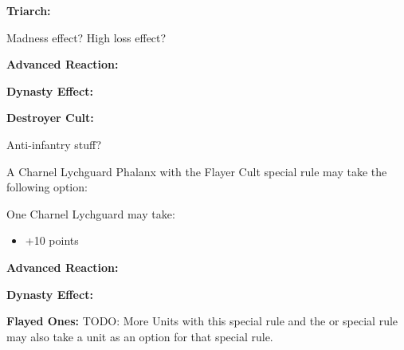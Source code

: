 \textbf{Triarch:}


\newpage
{}

Madness effect? High loss effect?

\textbf{Advanced Reaction:}

\textbf{Dynasty Effect:}

\textbf{Destroyer Cult:}


\newpage
{}

Anti-infantry stuff?

A Charnel Lychguard Phalanx with the Flayer Cult special rule may take the following option:

One Charnel Lychguard may take:
\begin{itemize}
	\item {} \dotfill +10 points
\end{itemize} 

\textbf{Advanced Reaction:}

\textbf{Dynasty Effect:}

\textbf{Flayed Ones:} TODO: More Units with this special rule and the  or  special rule may also take a  unit as an option for that special rule.

